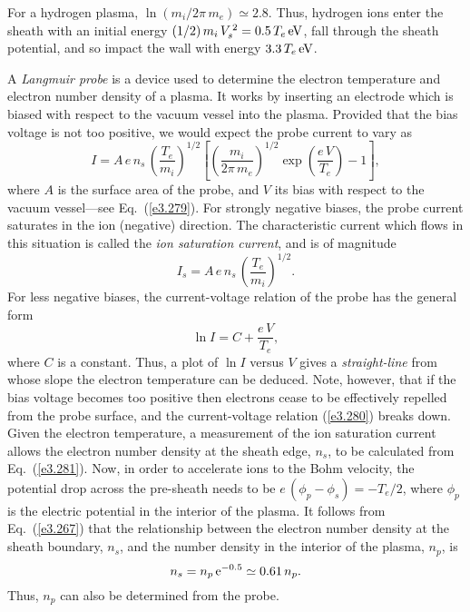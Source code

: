For a hydrogen plasma, $\ln(m_i/2\pi\,m_e)\simeq 2.8$. Thus, hydrogen
ions enter the sheath with an initial energy $(1/2)\,m_i\,V_s^{\,2} = 0.5\,T_e\,{\rm eV}$, fall through the sheath potential, and so impact the
wall with energy $3.3\,T_e\,{\rm eV}$. 

A {\em Langmuir probe}\/ is a device  used to determine the electron temperature and electron number density of a plasma. It works by inserting an electrode  which is biased with respect to the vacuum vessel into the plasma. Provided that the bias voltage is not too positive, we would
expect the probe current to vary as
\begin{equation}\label{e3.280}
I = A\,e\,n_s\,\left(\frac{T_e}{m_i}\right)^{1/2}\left[\left(\frac{m_i}{2\pi\,m_e}\right)^{1/2}\exp\left(\frac{e\,V}{T_e}\right)-1\right],
\end{equation}
where $A$ is the surface area of the probe, and $V$ its bias with respect to the vacuum vessel---see Eq.~(\ref{e3.279}). For strongly negative
biases, the probe current saturates in the ion (negative) direction. The
characteristic current which flows in this situation is called the {\em ion
saturation current}, and is of magnitude
\begin{equation}\label{e3.281}
I_s = A\,e\,n_s\,\left(\frac{T_e}{m_i}\right)^{1/2}.
\end{equation}
For less negative biases, the current-voltage relation of the probe
has the general form
\begin{equation}
\ln I = C + \frac{e\,V}{T_e},
\end{equation}
where $C$ is a constant. Thus, a plot of $\ln I$ versus $V$  gives
a {\em straight-line}\/  from whose slope the electron temperature can be deduced. Note, however, that if the bias voltage becomes too positive then
electrons cease to be effectively repelled from the probe surface, and the
current-voltage relation (\ref{e3.280}) breaks down.
Given the electron temperature, a measurement of the ion saturation current  allows the electron
number density at the sheath edge, $n_s$, to be calculated from Eq.~(\ref{e3.281}). Now, in order to accelerate ions to the Bohm velocity, the
potential drop across the pre-sheath needs to be $e\,(\phi_p-\phi_s) =- T_e/2$,
where $\phi_p$ is the electric potential in the interior of the plasma. It follows
from Eq.~(\ref{e3.267}) that the relationship between the electron number
density at the sheath boundary, $n_s$, and the number density   in the interior of the plasma, $n_p$,  is
\begin{equation}
n_s = n_p\,{\rm e}^{-0.5} \simeq 0.61\,n_p.
\end{equation}
Thus, $n_p$ can also be determined from the probe.